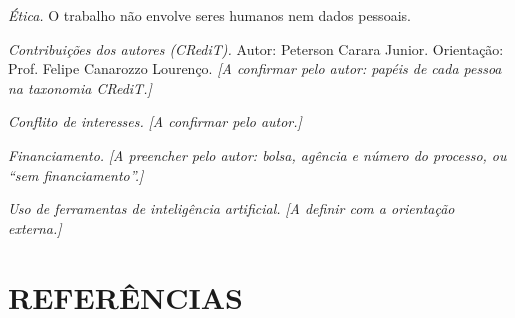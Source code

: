 \documentclass[12pt,a4paper]{article}
\begin{document}
\textit{Ética.} O trabalho não envolve seres humanos nem dados pessoais.

\textit{Contribuições dos autores (CRediT).} Autor: Peterson Carara Junior. Orientação: Prof. Felipe Canarozzo Lourenço. \textit{[A confirmar pelo autor: papéis de cada pessoa na taxonomia CRediT.]}

\textit{Conflito de interesses.} \textit{[A confirmar pelo autor.]}

\textit{Financiamento.} \textit{[A preencher pelo autor: bolsa, agência e número do processo, ou ``sem financiamento''.]}

\textit{Uso de ferramentas de inteligência artificial.} \textit{[A definir com a orientação externa.]}

\newpage
\section{REFERÊNCIAS}
\end{document}
